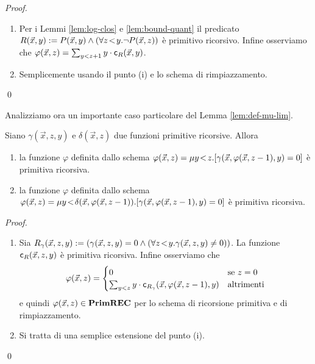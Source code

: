 \documentclass[runningheads,a4paper]{llncs}
\begin{document}
\begin{proof}
\begin{enumerate}[label=(\roman*)]
\item Per i Lemmi \ref{lem:log-clos} e \ref{lem:bound-quant} il predicato $R(\vec x,y) \mathrel{:=} P(\vec x,y) \wedge (\forall{z}\!<\!{y}.\neg P(\vec x,z))$ \`{e} primitivo ricorsivo. Infine osserviamo che $\varphi(\vec x,z) = \sum_{y < z+1} y \cdot \mathsf{c}_{R}(\vec x,y)$.
\item Semplicemente usando il punto (i) e lo schema di rimpiazzamento.
\end{enumerate}
\qed\end{proof}

Analizziamo ora un importante caso particolare del Lemma \ref{lem:def-mu-lim}. 

\begin{lemma}\label{lem:def-mu-lim-auto}
Siano $\gamma(\vec x,z,y)$ e $\delta(\vec x,z)$ due funzioni primitive ricorsive. Allora
\begin{enumerate}[label=(\roman*)]
\item la funzione $\varphi$ definita dallo schema $\varphi(\vec x,z) = \mu{y}\!<\!{z}.[\gamma(\vec x,\varphi(\vec x,z-1),y) = 0]$ \`{e} primitiva ricorsiva.
\item la funzione $\varphi$ definita dallo schema $\varphi(\vec x,z) = \mu{y}\!<\!{\delta(\vec x,\varphi(\vec x,z-1))}.[\gamma(\vec x,\varphi(\vec x,z-1),y) = 0]$ \`{e} primitiva ricorsiva.
\end{enumerate}
\end{lemma}

\begin{proof}
\begin{enumerate}[label=(\roman*)]
\item Sia $R_\gamma(\vec x,z,y) \mathrel{:=} (\gamma(\vec x,z,y) = 0 \wedge (\forall{z}\!<\!{y}.\gamma(\vec x,z,y) \neq 0))$. La funzione $\mathsf{c}_{R}(\vec x,z,y)$ \`{e} primitiva ricorsiva. Infine osserviamo che
$$
\varphi(\vec x,z) = 
\begin{cases}
0 & \mbox{se } z = 0 \\
\sum_{y < z} y \cdot \mathsf{c}_{R_\gamma}(\vec x,\varphi(\vec x,z-1),y) & \mbox{altrimenti} \\
\end{cases}
$$
e quindi $\varphi(\vec x,z) \in \mathbf{PrimREC}$ per lo schema di ricorsione primitiva e di rimpiazzamento.
\item Si tratta di una semplice estensione del punto (i).
\end{enumerate}
\qed\end{proof}
\end{document}
